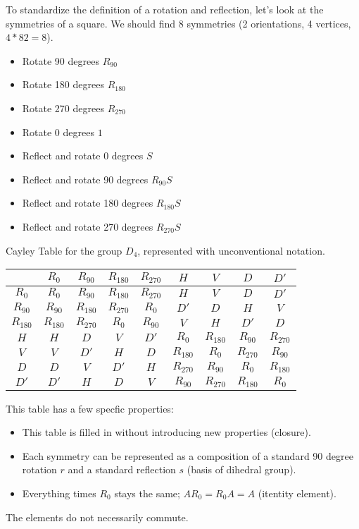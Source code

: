 To standardize the definition of a rotation and reflection, let's look at the symmetries of a square. We should find 8 symmetries (2 orientations, 4 vertices, $4*82=8$).
\begin{itemize}
	\item Rotate 90 degrees $R_{90}$
	\item Rotate 180 degrees $R_{180}$
	\item Rotate 270 degrees $R_{270}$
	\item Rotate 0 degrees $1$
	\item Reflect and rotate 0 degrees $S$
	\item Reflect and rotate 90 degrees $R_{90}S$
	\item Reflect and rotate 180 degrees $R_{180}S$
	\item Reflect and rotate 270 degrees $R_{270}S$
\end{itemize}
\begin{center}
	Cayley Table for the group $D_4$, represented with unconventional notation.\\
\begin{tabular}{c|cccccccc}
	&$R_0$ &$R_{90}$&$R_{180}$ &$R_{270}$&$H$ &$V$ &$D$ & $D'$ \\
	\hline
	$R_0$ &$R_0$ &$R_{90}$&$R_{180}$ &$R_{270}$ &$H$&$V$ &$D$ &$D'$ \\
	$R_{90}$ &$R_{90}$ & $R_{180}$ &$R_{270}$ &$R_0$ &$D'$ &$D$ &$H$ &$V$ \\
	$R_{180}$ &$R_{180}$ &$R_{270}$ &$R_0$ &$R_{90}$ &$V$ &$H$ &$D'$ &$D$ \\
	$H$ &$H$ &$D$ &$V$ &$D'$& $R_0$ &$R_{180}$&$R_{90}$ &$R_{270}$\\
	$V$ &$V$ &$D'$ &$H$ &$D$ &$R_{180}$ &$R_0$ &$R_{270}$ &$R_{90}$\\
	$D$ &$D$ &$V$ &$D'$&$H$ &$R_{270}$ &$R_{90}$ &$R_0$ &$R_{180}$ \\
	$D'$ &$D'$ &$H$ &$D$ &$V$ &$R_{90}$ &$R_{270}$ &$R_{180}$ &$R_0$
\end{tabular}
\end{center}

This table has a few specfic properties:
\begin{itemize}
	\item This table is filled in without introducing new properties (closure).
	\item Each symmetry can be represented as a composition of a standard 90 degree rotation $r$ and a standard reflection $s$ (basis of dihedral group).
	\item Everything times $R_0$ stays the same; $AR_0=R_0A=A$ (itentity element).
\end{itemize}
\begin{remark}
	The elements do not necessarily commute.
\end{remark}

